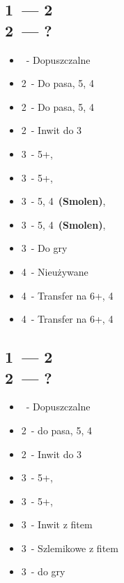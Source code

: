 \documentclass[12pt, a4paper]{article}
\begin{document}
    \subsection{1\ntx\ --- 2\clubs \\ 2\diams\ --- ?}
    \begin{itemize}
        \item \pass\ - Dopuszczalne
        \item 2\hearts\ - Do pasa, 5\hearts, 4\spades
        \item 2\spades\ - Do pasa, 5\spades, 4\hearts
        \item 2\nt\ - Inwit do 3\nt \br
        \item 3\clubs\ - 5+\clubs, \gf
        \item 3\diams\ - 5+\clubs, \gf 
        \item 3\hearts\ - 5\spades, 4\hearts\ \textbf{(Smolen)}, \gf
        \item 3\spades\ - 5\hearts, 4\spades\ \textbf{(Smolen)}, \gf
        \item 3\nt\ - Do gry \br
        \item 4\clubs\ - Nieużywane
        \item 4\diams\ - Transfer na 6+\hearts, 4\spades 
        \item 4\hearts\ - Transfer na 6+\spades, 4\hearts
    \end{itemize}

    \subsection{1\ntx\ --- 2\clubs \\ 2\hearts\ --- ?}
    \begin{itemize}
        \item \pass\ - Dopuszczalne
        \item 2\spades\ - do pasa, 5\spades, 4\diams
        \item 2\nt\ - Inwit do 3\nt \br
        \item 3\clubs\ - 5+\clubs, \gf
        \item 3\diams\ - 5+\diams, \gf 
        \item 3\hearts\ - Inwit z fitem \hearts
        \item 3\spades\ - Szlemikowe z fitem \hearts
        \item 3\nt\ - do gry
    \end{itemize}
\end{document}
